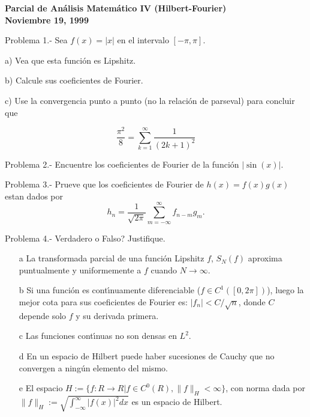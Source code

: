 \documentclass{article}
\begin{document}
\begin{center}
 \textbf{ Parcial de An\'alisis Matem\'atico IV (Hilbert-Fourier) \\
Noviembre 19, 1999 }
\end{center}

Problema 1.- 
%
Sea $f(x) = |x|$ en el intervalo $[-\pi,\pi]$. 

a) Vea que esta funci\'on es Lipshitz.

b) Calcule sus coeficientes de Fourier.

c) Use la convergencia punto a punto (no la relaci\'on de parseval) para concluir que 

\begin{equation}
  \frac{\pi^2}{8} = \sum_{k=1}^{\infty} \frac{1}{(2k+1)^2}
\end{equation}

Problema 2.-
%
Encuentre los coeficientes de Fourier de la funci\'on $|\sin(x)|$.

Problema 3.-
%
Prueve que los coeficientes de Fourier de $h(x) = f(x)g(x)$
estan dados por 
\begin{equation}
h_n = \frac{1}{\sqrt{2\pi}} \sum_{m=-\infty}^{\infty} f_{n-m} g_m.
\end{equation}





Problema 4.-
%
Verdadero o Falso? Justifique.

\begin{itemize}

\item[a] 
La transformada parcial de una funci\'on Lipshitz $f$, $S_N(f)$
aproxima puntualmente y uniformemente a $f$ cuando $N\to \infty$.

\item[b] 
Si una funci\'on es cont\'\i{}nuamente diferenciable ($f \in C^1([0,2\pi])$),
luego la mejor cota para sus coeficientes de Fourier es: $|f_n| < C/\sqrt{n}$,
donde $C$ depende solo $f$ y su derivada primera.

\item[c] 
Las funciones cont\'\i{}nuas no son densas en $L^2$.

\item[d] 
En un espacio de Hilbert puede haber sucesiones de Cauchy que no
convergen a ning\'un elemento del mismo.

\item[e] 
El espacio 
$H := \{f: R \to R | f \in C^0(R), \|f\|_H < \infty \}$, 
con norma dada por
$\|f\|_H := \sqrt{\int_{-\infty}^{\infty} |f(x)|^2 dx}$
es un espacio de Hilbert. 
\end{itemize}
\end{document}
